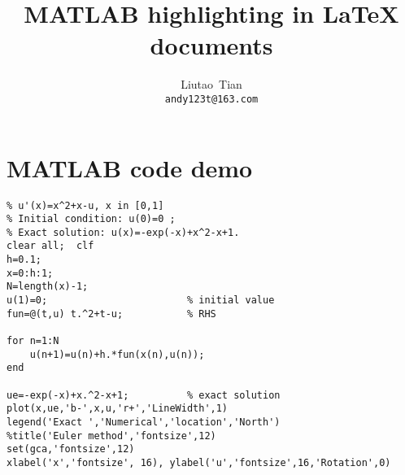 \documentclass[11pt]{article}
\title{MATLAB highlighting in LaTeX documents}
\author{Liutao~Tian \\ \texttt{andy123t@163.com}}
\date{}
\begin{document}
\maketitle

\section{MATLAB code demo}

\begin{lstlisting}[title={Euler method}]
% Euler method for the ODE model
% u'(x)=x^2+x-u, x in [0,1]
% Initial condition: u(0)=0 ;
% Exact solution: u(x)=-exp(-x)+x^2-x+1.
clear all;  clf
h=0.1;
x=0:h:1;
N=length(x)-1;
u(1)=0;                        % initial value
fun=@(t,u) t.^2+t-u;           % RHS

for n=1:N
    u(n+1)=u(n)+h.*fun(x(n),u(n));
end

ue=-exp(-x)+x.^2-x+1;          % exact solution
plot(x,ue,'b-',x,u,'r+','LineWidth',1)
legend('Exact ','Numerical','location','North')
%title('Euler method','fontsize',12)
set(gca,'fontsize',12)
xlabel('x','fontsize', 16), ylabel('u','fontsize',16,'Rotation',0)
\end{lstlisting}
\end{document}
